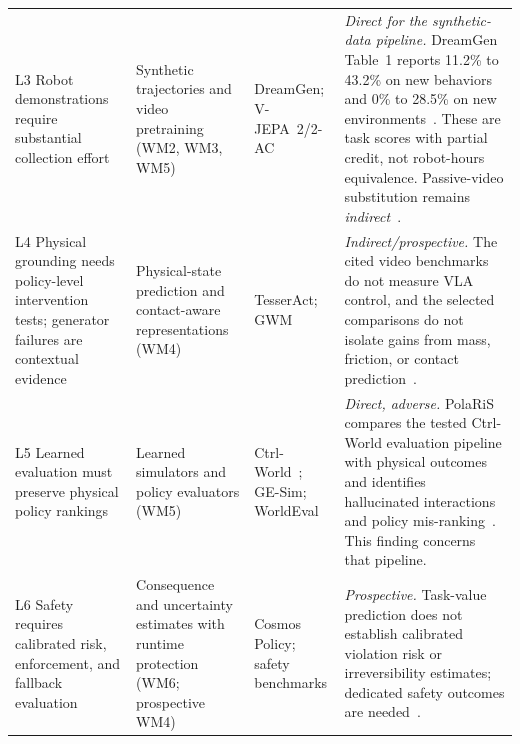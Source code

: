\documentclass{ieeeaccess}
\begin{document}
\begin{table}[!t]
\begin{tabular}{p{3.0cm}p{3.2cm}p{3.2cm}p{5.6cm}}
\addlinespace[2pt]
\textcolor[RGB]{104,48,148}{L3 Robot demonstrations require substantial collection effort~\cite{pi0,oxe}} & \textcolor[RGB]{104,48,148}{Synthetic trajectories and video pretraining (WM2, WM3, WM5)} & \textcolor[RGB]{104,48,148}{DreamGen; V-JEPA~2/2-AC} & \textcolor[RGB]{104,48,148}{\emph{Direct for the synthetic-data pipeline.} DreamGen Table~1 reports 11.2\% to 43.2\% on new behaviors and 0\% to 28.5\% on new environments~\cite{dreamgen}. These are task scores with partial credit, not robot-hours equivalence. Passive-video substitution remains \emph{indirect}~\cite{vjepa2}.} \\
\addlinespace[2pt]
\textcolor[RGB]{104,48,148}{L4 Physical grounding needs policy-level intervention tests; generator failures are contextual evidence~\cite{physicsiq,wmbench}} & \textcolor[RGB]{104,48,148}{Physical-state prediction and contact-aware representations (WM4)} & \textcolor[RGB]{104,48,148}{TesserAct; GWM} & \textcolor[RGB]{104,48,148}{\emph{Indirect/prospective.} The cited video benchmarks do not measure VLA control, and the selected comparisons do not isolate gains from mass, friction, or contact prediction~\cite{tesseract,gaussianworld}.} \\
\addlinespace[2pt]
\textcolor[RGB]{104,48,148}{L5 Learned evaluation must preserve physical policy rankings~\cite{polaris}} & \textcolor[RGB]{104,48,148}{Learned simulators and policy evaluators (WM5)} & \textcolor[RGB]{104,48,148}{Ctrl-World~\cite{ctrlworld}; GE-Sim; WorldEval} & \textcolor[RGB]{104,48,148}{\emph{Direct, adverse.} PolaRiS compares the tested Ctrl-World evaluation pipeline with physical outcomes and identifies hallucinated interactions and policy mis-ranking~\cite{polaris}. This finding concerns that pipeline.} \\
\addlinespace[2pt]
\textcolor[RGB]{104,48,148}{L6 Safety requires calibrated risk, enforcement, and fallback evaluation~\cite{knowno,safelibero,gemini15}} & \textcolor[RGB]{104,48,148}{Consequence and uncertainty estimates with runtime protection (WM6; prospective WM4)} & \textcolor[RGB]{104,48,148}{Cosmos Policy; safety benchmarks} & \textcolor[RGB]{104,48,148}{\emph{Prospective.} Task-value prediction does not establish calibrated violation risk or irreversibility estimates; dedicated safety outcomes are needed~\cite{cosmospolicy}.} \\
\bottomrule
\end{tabular}
\end{table}
\end{document}
